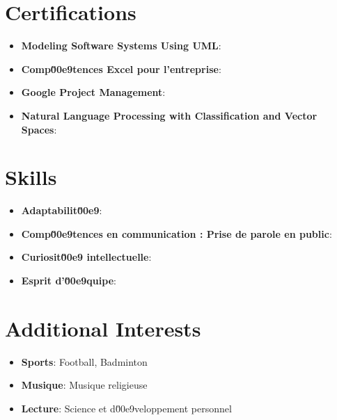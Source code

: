 \documentclass[a4paper,20pt]{article}
\newcommand{\resumeItem}[2]{
  \item\small{
    \textbf{#1}{: #2 \vspace{-2pt}}
  }
}
\newcommand{\resumeSubItem}[2]{\resumeItem{#1}{#2}\vspace{-3pt}}
\newcommand{\resumeSubHeadingListStart}{\begin{itemize}[leftmargin=*]}
\newcommand{\resumeSubHeadingListEnd}{\end{itemize}}
\begin{document}
\begin{multicols}{2}
\vspace{-5pt}
\section{Certifications}
\resumeSubHeadingListStart
\resumeSubItem{Modeling Software Systems Using UML}{}
\resumeSubItem{Comp\u00e9tences Excel pour l'entreprise}{}
\resumeSubItem{Google Project Management}{}
\resumeSubItem{Natural Language Processing with Classification and Vector Spaces}{}
\resumeSubHeadingListEnd

\vspace{-5pt}
\section{Skills}
\resumeSubHeadingListStart
\resumeSubItem{Adaptabilit\u00e9}{}
\resumeSubItem{Comp\u00e9tences en communication : Prise de parole en public}{}
\resumeSubItem{Curiosit\u00e9 intellectuelle}{}
\resumeSubItem{Esprit d'\u00e9quipe}{}
\resumeSubHeadingListEnd

\vspace{-5pt}
\section{Additional Interests}
\resumeSubHeadingListStart
\resumeSubItem{Sports}{Football, Badminton}
\resumeSubItem{Musique}{Musique religieuse}
\resumeSubItem{Lecture}{Science et d\u00e9veloppement personnel}
\resumeSubHeadingListEnd

\end{multicols}
\end{document}
